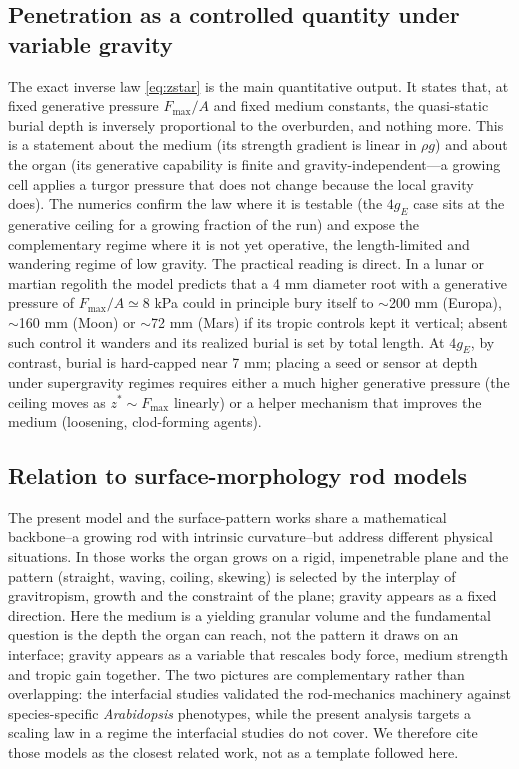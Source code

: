 \documentclass[preprint,12pt]{elsarticle}
\begin{document}
\subsection{Penetration as a controlled quantity under variable gravity}
The exact inverse law \eqref{eq:zstar} is the main quantitative output. It
states that, at fixed generative pressure $F_{\max}/A$ and fixed medium
constants, the quasi-static burial depth is inversely proportional to the
overburden, and nothing more. This is a statement about the medium (its
strength gradient is linear in $\rho g$) and about the organ (its generative
capability is finite and gravity-independent---a growing cell applies a
turgor pressure that does not change because the local gravity does). The
numerics confirm the law where it is testable (the $4g_E$ case sits at the
generative ceiling for a growing fraction of the run) and expose the
complementary regime where it is not yet operative, the length-limited and
wandering regime of low gravity. The
practical reading is direct. In a lunar or martian regolith the model
predicts that a 4 mm diameter root with a generative pressure of $F_{\max}/A
\simeq8$ kPa could in principle bury itself to $\sim$200 mm (Europa),
$\sim$160 mm (Moon) or $\sim$72 mm (Mars)
if its tropic controls kept it vertical; absent such control it wanders and
its realized burial is set by total length. At $4g_E$, by contrast, burial is
hard-capped near 7 mm; placing a seed or sensor at depth under supergravity
regimes requires either a much higher generative pressure (the ceiling
moves as $z^{*}\sim F_{\max}$ linearly) or a helper mechanism that improves
the medium (loosening, clod-forming agents).

\subsection{Relation to surface-morphology rod models}
The present model and the surface-pattern works \cite{sipos2022,porat2024}
share a mathematical backbone--a growing rod with intrinsic curvature--but
address different physical situations. In those works the organ grows on a
rigid, impenetrable plane and the pattern (straight, waving, coiling,
skewing) is selected by the interplay of gravitropism, growth and the
constraint of the plane; gravity appears as a fixed direction. Here the
medium is a yielding granular volume and the fundamental question is the
depth the organ can reach, not the pattern it draws on an interface; gravity
appears as a variable that rescales body force, medium strength and tropic
gain together. The two pictures are complementary rather than overlapping:
the interfacial studies validated the rod-mechanics machinery against
species-specific \emph{Arabidopsis} phenotypes, while the present analysis
targets a scaling law in a regime the interfacial studies do not cover. We
therefore cite those models as the closest related work, not as a template
followed here.
\end{document}
